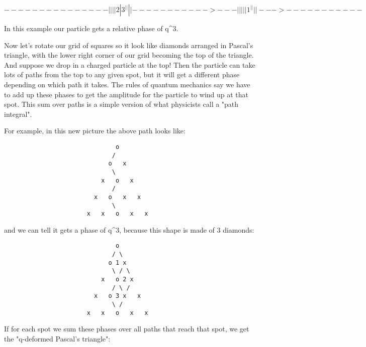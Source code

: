 $$
                ---------------
               |       |       |
               |   2   |   3   ^
               |       |       |
               |----------->---|
               |       |       |
               |   1   ^       |
               |       |       | 
                --->-----------
$$
    
In this example our particle gets a relative phase of q^{3}.

Now let's rotate our grid of squares so it look like diamonds arranged
in Pascal's triangle, with the lower right corner of our grid becoming
the top of the triangle.  And suppose we drop in a charged particle at
the top!  Then the particle can take lots of paths from the top to any
given spot, but it will get a different phase depending on which path 
it takes.  The rules of quantum mechanics say we have to add up these
phases to get the amplitude for the particle to wind up at that spot. 
This sum over paths is a simple version of what physicists call a 
"path integral".  

For example, in this new picture the above path looks like:

\begin{verbatim}
                               o
                              / 
                             o   x
                              \   
                           x   o   x
                              /       
                         x   o   x   x
                              \    
                       x   x   o   x   x
\end{verbatim}
    
and we can tell it gets a phase of q^{3}, because this shape is
made of 3 diamonds:

\begin{verbatim}
                               o
                              / \
                             o 1 x
                              \ / \
                           x   o 2 x
                              / \ / 
                         x   o 3 x   x
                              \ /
                       x   x   o   x   x
\end{verbatim}
    
If for each spot we sum these phases over all paths that reach
that spot, we get the "q-deformed Pascal's triangle":


